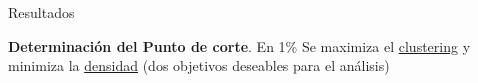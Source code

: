 \documentclass[compress]{beamer}
\begin{document}
\begin{frame}
\centering
\Large Resultados
\end{frame}

\begin{frame}

\scriptsize{
\textbf{Determinación del Punto de corte}. En 1\% Se maximiza el \underline{clustering} y minimiza la \underline{densidad} (dos objetivos deseables para el análisis)}

\begin{figure}
\centering
{}

\end{figure}
\end{frame}
\end{document}
